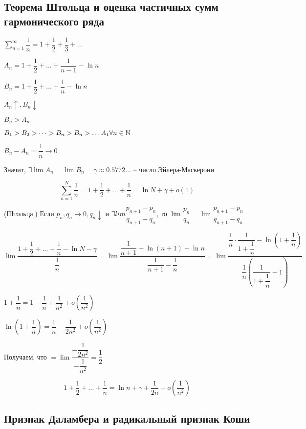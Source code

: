 \subsection{Теорема Штольца и оценка частичных сумм гармонического ряда}

$\sum_{n=1}^{\infty} \dfrac{1}{n} = 1 + \dfrac{1}{2} + \dfrac{1}{3} + \dots$

$A_n = 1 + \dfrac{1}{2} + \dots + \dfrac{1}{n - 1} - \ln n$

$B_n = 1 + \dfrac{1}{2} + \dots + \dfrac{1}{n} - \ln n$

$A_n \uparrow, B_n \downarrow$

$B_n > A_n$

$B_1 > B_2 > \dots > B_n > B_n > \dots A_1 \forall n \in \mathbb{N}$

$B_n - A_n = \dfrac{1}{n} \to 0$ 

Значит, $\exists \lim A_n = \lim B_n = \gamma \approx 0.5772\dots$ -- число Эйлера-Маскерони

$$ \sum_{n=1}^{N} \dfrac{1}{n} = 1 + \dfrac{1}{2} + \dots + \dfrac{1}{n} = \ln N + \gamma + o(1) $$

\begin{theorem}
(Штольца.) Если $p_n, q_n \to 0, q_n \downarrow$ и $\exists lim \dfrac{p_{n + 1} - p_n}{q_{n + 1} - q_n}$, то
$\lim \dfrac{p_n}{q_n} = \lim \dfrac{p_{n + 1} - p_n}{q_{n + 1} - q_n}$
\end{theorem}

\begin{example}
$\lim \dfrac{1 + \dfrac{1}{2} + \dots + \dfrac{1}{n} - \ln N - \gamma}{\dfrac{1}{n}} = \lim \dfrac{\dfrac{1}{n + 1} - \ln(n + 1) + \ln n}{\dfrac{1}{n + 1} - \dfrac{1}{n}} =
\lim \dfrac{\dfrac{1}{n} \cdot \dfrac{1}{1 + \dfrac{1}{n}} - \ln(1 + \dfrac{1}{n})}{\dfrac{1}{n}(\dfrac{1}{1 + \dfrac{1}{n}} - 1)}$

$1 + \dfrac{1}{n} = 1 - \dfrac{1}{n} + \dfrac{1}{n^2} + o\left(\dfrac{1}{n^2}\right)$

$\ln(1 + \dfrac{1}{n}) = \dfrac{1}{n} - \dfrac{1}{2n^2} + o\left(\dfrac{1}{n^2}\right)$

Получаем, что $= \lim \dfrac{-\dfrac{1}{2n^2}}{-\dfrac{1}{n^2}} = \dfrac{1}{2}$

$$ 1 + \dfrac{1}{2} + \dots + \dfrac{1}{n} = \ln n + \gamma + \dfrac{1}{2n} + o\left(\dfrac{1}{n^2}\right) $$
\end{example}

\subsection{Признак Даламбера и радикальный признак Коши}

